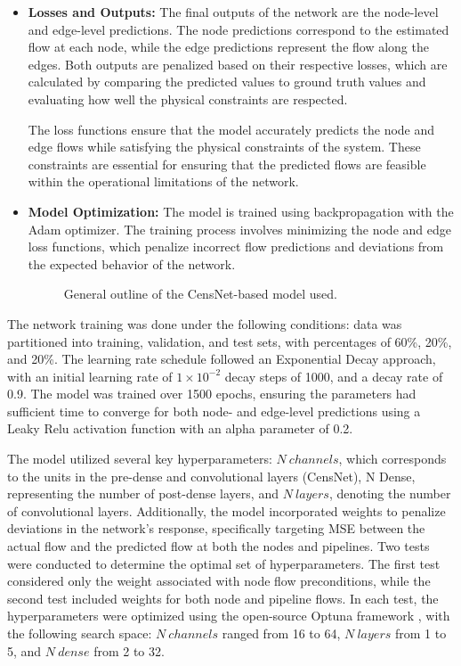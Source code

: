 \begin{itemize}
    \item \textbf{Losses and Outputs:} The final outputs of the network are the node-level and edge-level predictions. The node predictions correspond to the estimated flow at each node, while the edge predictions represent the flow along the edges. Both outputs are penalized based on their respective losses, which are calculated by comparing the predicted values to ground truth values and evaluating how well the physical constraints are respected.

The loss functions ensure that the model accurately predicts the node and edge flows while satisfying the physical constraints of the system. These constraints are essential for ensuring that the predicted flows are feasible within the operational limitations of the network. 
    \item \textbf{Model Optimization:} The model is trained using backpropagation with the Adam optimizer. The training process involves minimizing the node and edge loss functions, which penalize incorrect flow predictions and deviations from the expected behavior of the network.

\begin{figure}
    \centering
    \setlength{}        
    \setlength{}
    \resizebox{\figurewidth}{\figureheight}{}
    \caption{General outline of the CensNet-based model used.}
    \label{fig:model_description}
\end{figure}
\end{itemize}


The network training was done under the following conditions: data was partitioned into training, validation, and test sets, with percentages of 60\%, 20\%, and 20\%. The learning rate schedule followed an Exponential Decay approach, with an initial learning rate of $1 \times 10^{-2}$ decay steps of 1000, and a decay rate of 0.9. The model was trained over 1500 epochs, ensuring the parameters had sufficient time to converge for both node- and edge-level predictions using a Leaky Relu activation function with an alpha parameter of 0.2.


The model utilized several key hyperparameters: $N \ channels$, which corresponds to the units in the pre-dense and convolutional layers (CensNet), N Dense, representing the number of post-dense layers, and $N \ layers$, denoting the number of convolutional layers. Additionally, the model incorporated weights to penalize deviations in the network's response, specifically targeting MSE between the actual flow and the predicted flow at both the nodes and pipelines. Two tests were conducted to determine the optimal set of hyperparameters. The first test considered only the weight associated with node flow preconditions, while the second test included weights for both node and pipeline flows. In each test, the hyperparameters were optimized using the open-source Optuna framework \cite{optuna_2019}, with the following search space: $N \ channels$ ranged from 16 to 64, $N \ layers$ from 1 to 5, and $N \ dense$ from 2 to 32.




